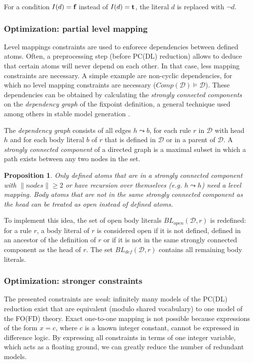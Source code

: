 \documentclass{tlp}
\newcommand{\Tr}{\mbox{\bf t}}
\newcommand{\Fa}{\mbox{\bf f}}
\newcommand{\openset}[2]{BL_{open}(#1, #2)}
\newcommand{\defset}[2]{BL_{def}(#1, #2)}
\newcommand{\FD}{\ensuremath{\mathcal{D}}\xspace}
\newtheorem{proposition}[lemma]{Proposition}
\begin{document}
For a condition $I(d)=\Fa$ instead of $I(d) =\Tr$, the literal $d$ is replaced with $\lnot d$.

\subsubsection{Optimization: partial level mapping}
Level mappings constraints are used to enforece dependencies between defined atoms. Often, a preprocessing step (before PC(DL) reduction) allows to deduce that certain atoms will never depend on each other. In that case, less mapping constraints are necessary. A simple example are non-cyclic dependencies, for which no level mapping constraints are necessary ($Comp(\FD)\models \FD$). These dependencies can be obtained by calculating the \emph{strongly connected components} \cite{siamcomp/Tarjan72} on the \emph{dependency graph} of the fixpoint definition, a general technique used among others in stable model generation \cite{lpnmr/SyrjanenN01}.

The \emph{dependency graph} consists of all edges $h \leadsto b$, for each rule $r$ in $\FD$ with head $h$ and for each body literal $b$ of $r$ that is defined in $\FD$ or in a parent of $\FD$. A \emph{strongly connected component} of a directed graph is a maximal subset in which a path exists between any two nodes in the set.

\begin{proposition}
Only defined atoms that are in a strongly connected component with $\|nodes\|\geq 2$ or have recursion over themselves (e.g. $h \leadsto h$) need a level mapping. Body atoms that are not in the same strongly connected component as the head can be treated as open instead of defined atoms.
\end{proposition}

To implement this idea, the set of open body literals $\openset{\FD}{r}$ is redefined: for a rule $r$, a body literal of $r$ is considered open if it is not defined, defined in an ancestor of the definition of $r$ or if it is not in the same strongly connected component as the head of $r$. The set $\defset{\FD}{r}$ contains all remaining body literals.

\subsubsection{Optimization: stronger constraints}
The presented constraints are \emph{weak}: infinitely many models of the PC(DL) reduction exist that are equivalent (modulo shared vocabulary) to one model of the FO(FD) theory. Exact one-to-one mapping is not possible because expressions of the form $x=c$, where $c$ is a known integer constant, cannot be expressed in difference logic. By expressing all constraints in terms of one integer variable, which acts as a floating ground, we can greatly reduce the number of redundant models.
\end{document}

